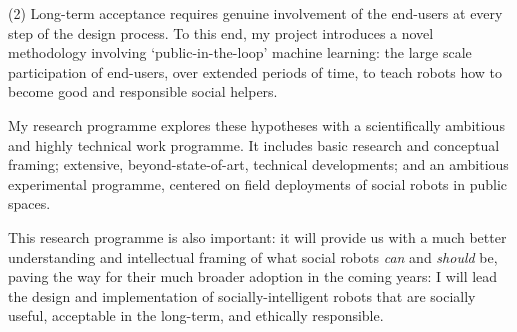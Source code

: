 \documentclass[12pt,a4paper]{article}
\begin{document}
(2) Long-term acceptance requires genuine involvement of the end-users at every
step of the design process. To this end, my project introduces a novel methodology
involving `public-in-the-loop' machine learning: the large scale participation
of end-users, over extended periods of time, to teach robots how to become 
good and responsible social helpers.

My research programme explores these hypotheses with a scientifically ambitious and
highly technical work programme. It includes basic research and conceptual
framing; extensive, beyond-state-of-art, technical developments; and an
ambitious experimental programme, centered on field deployments of social robots
in public spaces.

This research programme is also important: it will provide us with a much better
understanding and intellectual framing of what social robots \emph{can} and
\emph{should} be, paving the way for their much broader adoption in the coming
years: I will lead the design and implementation of socially-intelligent
robots that are socially useful, acceptable in the long-term, and ethically
responsible.


\newpage

\tableofcontents

\pagebreak




\pagebreak

%


\pagebreak





%

\pagebreak
\printbibliography
\end{document}

